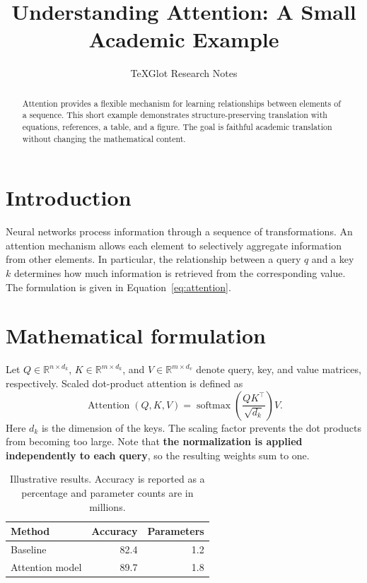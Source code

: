 \documentclass[11pt]{article}
\title{Understanding Attention: A Small Academic Example}
\author{TeXGlot Research Notes}
\date{}
\begin{document}
\maketitle
\begin{abstract}
Attention provides a flexible mechanism for learning relationships between elements of a sequence. This short example demonstrates structure-preserving translation with equations, references, a table, and a figure. The goal is faithful academic translation without changing the mathematical content.
\end{abstract}
\section{Introduction}
Neural networks process information through a sequence of transformations. An attention mechanism allows each element to selectively aggregate information from other elements. In particular, the relationship between a query $q$ and a key $k$ determines how much information is retrieved from the corresponding value. The formulation is given in Equation~\ref{eq:attention}.

\section{Mathematical formulation}
Let $Q\in\mathbb{R}^{n\times d_k}$, $K\in\mathbb{R}^{m\times d_k}$, and $V\in\mathbb{R}^{m\times d_v}$ denote query, key, and value matrices, respectively. Scaled dot-product attention is defined as
\begin{equation}
\label{eq:attention}
\operatorname{Attention}(Q,K,V)=\operatorname{softmax}\left(\frac{QK^\top}{\sqrt{d_k}}\right)V.
\end{equation}
Here $d_k$ is the dimension of the keys. The scaling factor prevents the dot products from becoming too large. Note that \textbf{the normalization is applied independently to each query}, so the resulting weights sum to one.

\begin{table}[h]
\centering
\begin{tabular}{lrr}
\toprule
Method & Accuracy & Parameters \\
\midrule
Baseline & 82.4 & 1.2 \\
Attention model & 89.7 & 1.8 \\
\bottomrule
\end{tabular}
\caption{Illustrative results. Accuracy is reported as a percentage and parameter counts are in millions.}
\label{tab:results}
\end{table}
\end{document}
